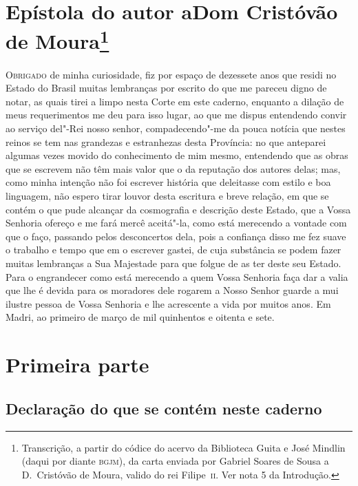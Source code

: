 \chapter[Epístola do autor a Dom Cristóvão de Moura]{Epístola do autor a\break Dom
Cristóvão de Moura\footnote[*]{ Transcrição, a partir do códice do acervo da
Biblioteca Guita e José Mindlin (daqui por diante \textsc{bgjm}), da carta
enviada por Gabriel Soares de Sousa a D.~Cristóvão de Moura, valido do rei
Filipe~\textsc{ii}. Ver nota 5 da Introdução.}}


\textsc{Obrigado} de minha curiosidade, fiz por espaço de dezessete anos que residi no
Estado do Brasil muitas lembranças por escrito do que me pareceu digno de notar, as quais
tirei a limpo nesta Corte em este caderno, enquanto a dilação de meus requerimentos me deu
para isso lugar, ao que me dispus entendendo convir ao serviço del"-Rei nosso senhor,
compadecendo"-me da pouca notícia que nestes reinos se tem nas grandezas e estranhezas
desta Província: no que anteparei algumas vezes movido do conhecimento de mim mesmo,
entendendo que as obras que se escrevem não têm mais valor que o da reputação dos autores
delas; mas, como minha intenção não foi escrever história que deleitasse com estilo e boa
linguagem, não espero tirar louvor desta escritura e breve relação, em que se contém o que
pude alcançar da cosmografia e descrição deste Estado, que a Vossa Senhoria ofereço e me
fará mercê aceitá"-la, como está merecendo a vontade com que o faço, passando pelos
desconcertos dela, pois a confiança disso me fez suave o trabalho e tempo que em o
escrever gastei, de cuja substância se podem fazer muitas lembranças a Sua Majestade para
que folgue de as ter deste seu Estado. Para o engrandecer como está merecendo a quem Vossa
Senhoria faça dar a valia que lhe é devida para os moradores dele rogarem a Nosso Senhor
guarde a mui ilustre pessoa de Vossa Senhoria e lhe acrescente a vida por muitos anos. Em
Madri, ao primeiro de março de mil quinhentos e oitenta e sete.


\chapter[Primeira parte: Roteiro geral]{Primeira parte }

\section*{Declaração do que se contém neste caderno}


